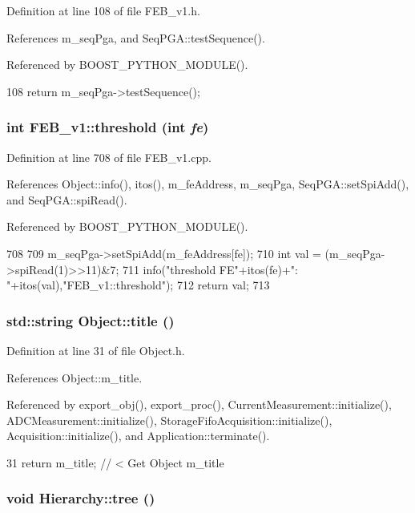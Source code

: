 Definition at line 108 of file FEB\_\-v1.h.

References m\_\-seqPga, and SeqPGA::testSequence().

Referenced by BOOST\_\-PYTHON\_\-MODULE().


\begin{DoxyCode}
108 { return m_seqPga->testSequence(); }
\end{DoxyCode}
\hypertarget{classFEB__v1_a71e54700c59857844905c879e4b3d4fd}{
\subsubsection[{threshold}]{\setlength{\rightskip}{0pt plus 5cm}int FEB\_\-v1::threshold (int {\em fe})}}
\label{classFEB__v1_a71e54700c59857844905c879e4b3d4fd}


Definition at line 708 of file FEB\_\-v1.cpp.

References Object::info(), itos(), m\_\-feAddress, m\_\-seqPga, SeqPGA::setSpiAdd(), and SeqPGA::spiRead().

Referenced by BOOST\_\-PYTHON\_\-MODULE().


\begin{DoxyCode}
708                              {
709   m_seqPga->setSpiAdd(m_feAddress[fe]);
710   int val = (m_seqPga->spiRead(1)>>11)&7;
711   info("threshold FE"+itos(fe)+": "+itos(val),"FEB_v1::threshold");
712   return val;
713 }
\end{DoxyCode}
\hypertarget{classObject_a73a0f1a41828fdd8303dd662446fb6c3}{
\subsubsection[{title}]{\setlength{\rightskip}{0pt plus 5cm}std::string Object::title ()}}
\label{classObject_a73a0f1a41828fdd8303dd662446fb6c3}


Definition at line 31 of file Object.h.

References Object::m\_\-title.

Referenced by export\_\-obj(), export\_\-proc(), CurrentMeasurement::initialize(), ADCMeasurement::initialize(), StorageFifoAcquisition::initialize(), Acquisition::initialize(), and Application::terminate().


\begin{DoxyCode}
31 { return m_title;      } // < Get Object m_title
\end{DoxyCode}
\hypertarget{classHierarchy_a594c294c5f60c230e106d522ed008212}{
\subsubsection[{tree}]{\setlength{\rightskip}{0pt plus 5cm}void Hierarchy::tree ()}}
\label{classHierarchy_a594c294c5f60c230e106d522ed008212}



